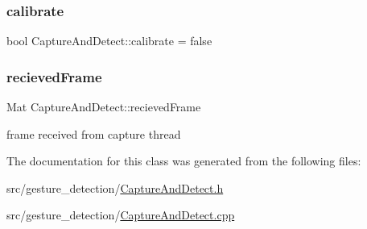 \subsubsection{\texorpdfstring{calibrate}{calibrate}}
{\footnotesize\ttfamily bool Capture\+And\+Detect\+::calibrate = false}

\mbox{\label{classCaptureAndDetect_ad614571fedee59ecccccf0c14c3dd542}} 
\subsubsection{\texorpdfstring{recieved\+Frame}{recievedFrame}}
{\footnotesize\ttfamily Mat Capture\+And\+Detect\+::recieved\+Frame}



frame received from capture thread 



The documentation for this class was generated from the following files\+:\begin{DoxyCompactItemize}
\item 
src/gesture\+\_\+detection/\hyperlink{CaptureAndDetect_8h}{Capture\+And\+Detect.\+h}\item 
src/gesture\+\_\+detection/\hyperlink{CaptureAndDetect_8cpp}{Capture\+And\+Detect.\+cpp}\end{DoxyCompactItemize}
